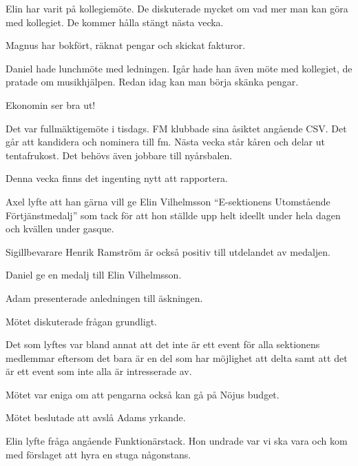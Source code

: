 \documentclass[10pt]{article}
\begin{document}
\begin{paragrafer}
\begin{paragrafer}
		Elin har varit på kollegiemöte. De diskuterade mycket om vad mer man kan göra med kollegiet. De kommer hålla stängt nästa vecka. 

		Magnus har bokfört, räknat pengar och skickat fakturor.

		Daniel hade lunchmöte med ledningen. Igår hade han även möte med kollegiet, de pratade om musikhjälpen. Redan idag kan man börja skänka pengar. 


		Ekonomin ser bra ut!


		Det var fullmäktigemöte i tisdags. FM klubbade sina åsiktet angående CSV. Det går att kandidera och nominera till fm. Nästa vecka står kåren och delar ut tentafrukost. Det behövs även jobbare till nyårsbalen. 


		Denna vecka finns det ingenting nytt att rapportera.


	\end{paragrafer}

	
	Axel lyfte att han gärna vill ge Elin Vilhelmsson ``E-sektionens Utomstående Förtjänstmedalj'' som tack för att hon ställde upp helt ideellt under hela dagen och kvällen under gasque. 

	Sigillbevarare Henrik Ramström är också positiv till utdelandet av medaljen.
	
	Daniel \ypa ge en medalj till Elin Vilhelmsson.

	\Mbaby


	Adam presenterade anledningen till äskningen. 

	Mötet diskuterade frågan grundligt. 

	Det som lyftes var bland annat att det inte är ett event för alla sektionens medlemmar eftersom det bara är en del som har möjlighet att delta samt att det är ett event som inte alla är intresserade av.

	Mötet var eniga om att pengarna också kan gå på Nöjus budget.

	Mötet beslutade att avslå Adams yrkande.


	Elin lyfte fråga angående Funktionärstack. Hon undrade var vi ska vara och kom med förslaget att hyra en stuga någonstans.


\end{paragrafer}
\end{document}
